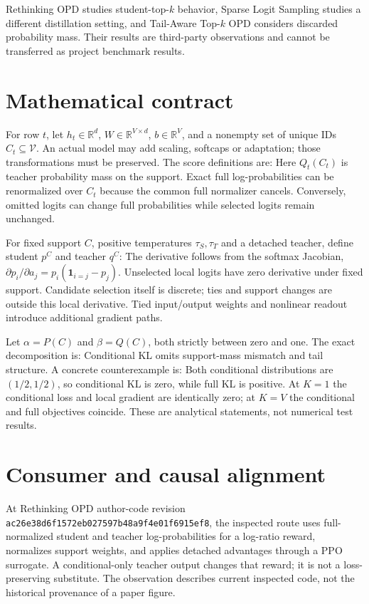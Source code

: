 \documentclass[11pt,a4paper]{article}
\newcommand{\code}[1]{{\small\nolinkurl{#1}}}
\begin{document}
Rethinking OPD studies student-top-$k$ behavior, Sparse Logit Sampling studies a different distillation setting, and Tail-Aware Top-$k$ OPD considers discarded probability mass. Their results are third-party observations and cannot be transferred as project benchmark results.\cite{rethinking2026,anshumann-etal-2025-sparse,tailaware2026}
\section{Mathematical contract}
For row $t$, let $h_t\in\mathbb{R}^d$, $W\in\mathbb{R}^{V\times d}$, $b\in\mathbb{R}^V$, and a nonempty set of unique IDs $C_t\subseteq\mathcal V$. An actual model may add scaling, softcaps or adaptation; those transformations must be preserved. The score definitions are:
\ScoreEquations
Here $Q_t(C_t)$ is teacher probability mass on the support. Exact full log-probabilities can be renormalized over $C_t$ because the common full normalizer cancels. Conversely, omitted logits can change full probabilities while selected logits remain unchanged.

For fixed support $C$, positive temperatures $\tau_S,\tau_T$ and a detached teacher, define student $p^C$ and teacher $q^C$:
\KLEquations
The derivative follows from the softmax Jacobian, $\partial p_i/\partial a_j=p_i(\mathbf 1_{i=j}-p_j)$. Unselected local logits have zero derivative under fixed support. Candidate selection itself is discrete; ties and support changes are outside this local derivative. Tied input/output weights and nonlinear readout introduce additional gradient paths.

Let $\alpha=P(C)$ and $\beta=Q(C)$, both strictly between zero and one. The exact decomposition is:
\Decomposition
Conditional KL omits support-mass mismatch and tail structure. A concrete counterexample is:
\CounterExample
Both conditional distributions are $(1/2,1/2)$, so conditional KL is zero, while full KL is positive. At $K=1$ the conditional loss and local gradient are identically zero; at $K=V$ the conditional and full objectives coincide. These are analytical statements, not numerical test results.
\section{Consumer and causal alignment}
At Rethinking OPD author-code revision \code{ac26e38d6f1572eb027597b48a9f4e01f6915ef8}, the inspected route uses full-normalized student and teacher log-probabilities for a log-ratio reward, normalizes support weights, and applies detached advantages through a PPO surrogate. A conditional-only teacher output changes that reward; it is not a loss-preserving substitute. The observation describes current inspected code, not the historical provenance of a paper figure.\cite{opdauthorcode,rethinking2026}
\end{document}
